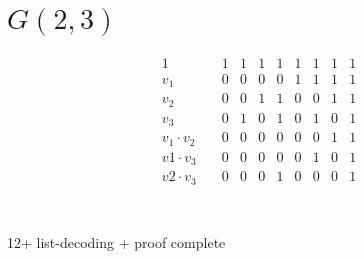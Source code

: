 \documentclass[]{article}
\begin{document}
\section{$G(2,3)$}

\begin{equation}
\begin{array}{l|cccccccc}
1 \quad&         1&1&1&1&1&1&1&1 \\

v_1 \quad&       0&0&0&0&1&1&1&1 \\
v_2 \quad&       0&0&1&1&0&0&1&1 \\
v_3 \quad&       0&1&0&1&0&1&0&1 \\
v_1\cdot v_2 \quad& 0&0&0&0&0&0&1&1 \\ 
v1\cdot v_3 \quad& 0&0&0&0&0&1&0&1 \\
v2\cdot v_3 \quad& 0&0&0&1&0&0&0&1 \\

\end{array}
\end{equation}

\section{}
12+
list-decoding +
proof complete
\end{document}
